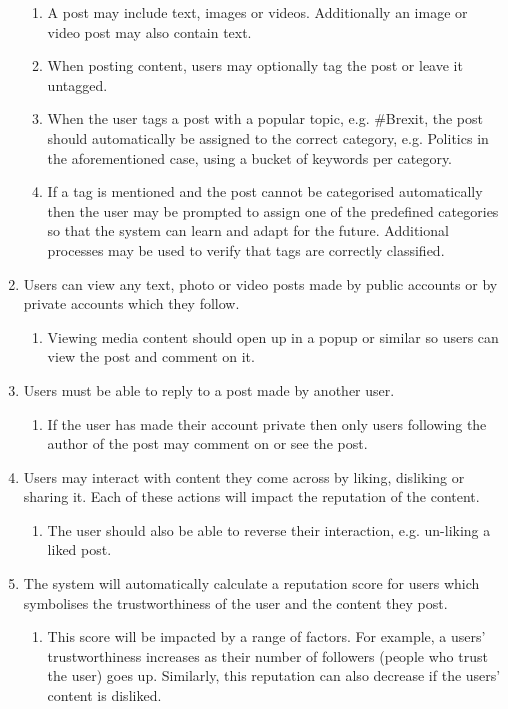 \begin{enumerate}[label=\textbf{F\arabic*}]
\begin{enumerate}
			\item A post may include text, images or videos. Additionally an image or video post may also contain text.
			\item When posting content, users may optionally tag the post or leave it untagged.
			\item When the user tags a post with a popular topic, e.g. \#Brexit, the post should automatically be assigned to the correct category, e.g. Politics in the aforementioned case, using a bucket of keywords per category.
			\item If a tag is mentioned and the post cannot be categorised automatically then the user may be prompted to assign one of the predefined categories so that the system can learn and adapt for the future. Additional processes may be used to verify that tags are correctly classified.
		\end{enumerate}
	\item Users can view any text, photo or video posts made by public accounts or by private accounts which they follow.
		\begin{enumerate}
			\item Viewing media content should open up in a popup or similar so users can view the post and comment on it.
		\end{enumerate}
	\item Users must be able to reply to a post made by another user.
		\begin{enumerate}
			\item If the user has made their account private then only users following the author of the post may comment on or see the post.
		\end{enumerate}
	\item Users may interact with content they come across by liking, disliking or sharing it. Each of these actions will impact the reputation of the content.
		\begin{enumerate}
			\item The user should also be able to reverse their interaction, e.g. un-liking a liked post.
		\end{enumerate}
	\item The system will automatically calculate a reputation score for users which symbolises the trustworthiness of the user and the content they post.
		\begin{enumerate}
			\item This score will be impacted by a range of factors. For example, a users' trustworthiness increases as their number of followers (people who trust the user) goes up. Similarly, this reputation can also decrease if the users' content is disliked.

\end{enumerate}
\end{enumerate}
